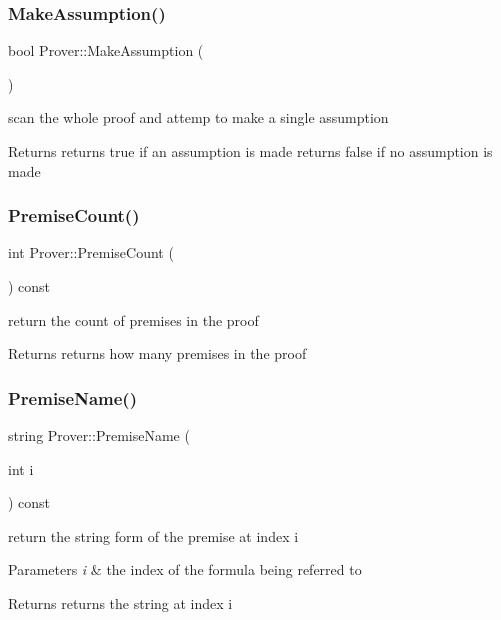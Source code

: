 \subsubsection{\texorpdfstring{Make\+Assumption()}{MakeAssumption()}}
{\footnotesize\ttfamily bool Prover\+::\+Make\+Assumption (\begin{DoxyParamCaption}{ }\end{DoxyParamCaption})}

scan the whole proof and attemp to make a single assumption \begin{DoxyReturn}{Returns}
returns true if an assumption is made returns false if no assumption is made 
\end{DoxyReturn}
\mbox{\label{classProver_ab33b18bf4e9c3ea6a3dd48e47e90e5ef}} 
\subsubsection{\texorpdfstring{Premise\+Count()}{PremiseCount()}}
{\footnotesize\ttfamily int Prover\+::\+Premise\+Count (\begin{DoxyParamCaption}{ }\end{DoxyParamCaption}) const}

return the count of premises in the proof \begin{DoxyReturn}{Returns}
returns how many premises in the proof 
\end{DoxyReturn}
\mbox{\label{classProver_aaf06243b77406aa09ff55e59eec448f3}} 
\subsubsection{\texorpdfstring{Premise\+Name()}{PremiseName()}}
{\footnotesize\ttfamily string Prover\+::\+Premise\+Name (\begin{DoxyParamCaption}\item[{int}]{i }\end{DoxyParamCaption}) const}

return the string form of the premise at index i 
\begin{DoxyParams}{Parameters}
{\em i} & the index of the formula being referred to \\
\hline
\end{DoxyParams}
\begin{DoxyReturn}{Returns}
returns the string at index i 
\end{DoxyReturn}
\mbox{\label{classProver_aecc46e8d5521ff62e283755fb44b68e2}} 
